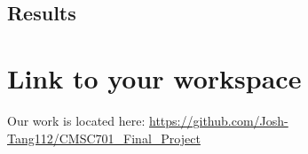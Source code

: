 \documentclass[10pt]{article}
\begin{document}
\subsection{Results}

\section{Link to your workspace}

Our work is located here:
\url{https://github.com/Josh-Tang112/CMSC701_Final_Project}



\end{document}
